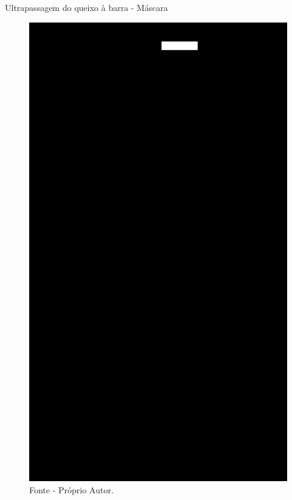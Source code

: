 \begin{frame}{Ultrapassagem do queixo à barra - Máscara}
    \begin{figure}[!ht]
        \centering
            \includegraphics[scale=0.1]{img/desenvolvimento/ultrapassagemBarra/mask_head.png}
        \caption*{Fonte - Próprio Autor.}
    \end{figure}
\end{frame}


